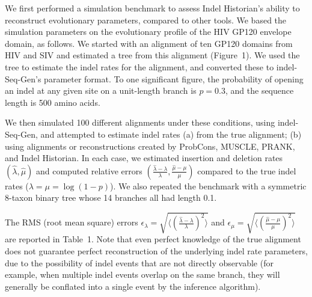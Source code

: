 \documentclass{bioinfo}
\begin{document}
We first performed a simulation benchmark to assess Indel Historian's ability to reconstruct evolutionary parameters,
compared to other tools.
We based the simulation parameters on the evolutionary profile of the HIV GP120 envelope domain, as follows.
We started with an alignment of ten GP120 domains from HIV and SIV and estimated a tree from this alignment (Figure~1).
We used the tree to estimate the indel rates for the alignment, and converted these to indel-Seq-Gen's parameter format.
To one significant figure, the probability of opening an indel at any given site on a unit-length branch is $p=0.3$, and the sequence length is 500 amino acids.

We then simulated 100 different alignments under these conditions, using indel-Seq-Gen, and attempted to estimate indel rates
(a) from the true alignment; (b) using alignments or reconstructions created by ProbCons, MUSCLE, PRANK, and Indel Historian.
In each case, we estimated insertion and deletion rates $(\hat{\lambda},\hat{\mu})$ and computed relative errors $(\frac{\hat{\lambda}-\lambda}{\lambda},\frac{\hat{\mu}-\mu}{\mu})$
compared to the true indel rates ($\lambda = \mu = \log(1-p)$).
We also repeated the benchmark with a symmetric 8-taxon binary tree whose 14 branches all had length 0.1.

The RMS (root mean square) errors
$\epsilon_\lambda = \sqrt{\langle \left( \frac{\hat{\lambda}-\lambda}{\lambda} \right)^2 \rangle}$
and
$\epsilon_\mu = \sqrt{\langle \left( \frac{\hat{\mu}-\mu}{\mu} \right)^2 \rangle}$
are reported in Table~1.
Note that even perfect knowledge of the true alignment does not guarantee perfect reconstruction of the underlying indel rate parameters,
due to the possibility of indel events that are not directly observable (for example, when multiple indel events overlap on the same branch,
they will generally be conflated into a single event by the inference algorithm).
\end{document}
